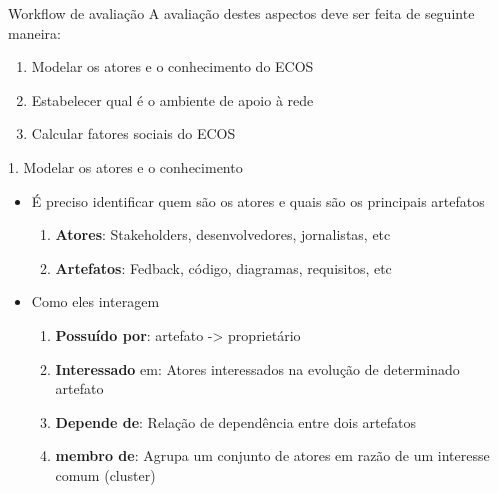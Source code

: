 \documentclass[10pt, compress,british,xcolor={svgnames,dvipsnames,x11names},trans]{beamer}
\begin{document}
\begin{frame}{Workflow de avaliação}
  A avaliação destes aspectos deve ser feita de seguinte maneira:
	\begin{enumerate}
		\item Modelar os atores e o conhecimento do ECOS
		\item Estabelecer qual é o ambiente de apoio à rede
		\item Calcular fatores sociais do ECOS
	\end{enumerate}
\end{frame}

\begin{frame}{1. Modelar os atores e o conhecimento}
	\begin{itemize}
		\item É preciso identificar quem são os atores e quais são os principais artefatos
    \begin{enumerate}
        \item \textbf{Atores}: Stakeholders, desenvolvedores, jornalistas, etc
        \item \textbf{Artefatos}: Fedback, código, diagramas, requisitos, etc
    \end{enumerate}
		\item Como eles interagem
    \begin{enumerate}
        \item \textbf{Possuído por}: artefato -> proprietário
        \item \textbf{Interessado} em: Atores interessados na evolução de determinado artefato
        \item \textbf{Depende de}: Relação de dependência entre dois artefatos
        \item \textbf{membro de}: Agrupa um conjunto de atores em razão de um interesse comum (cluster)
    \end{enumerate}
	\end{itemize}
\end{frame}
\end{document}

